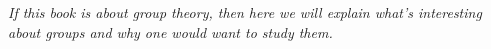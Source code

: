 
{\em If this book is about group theory, then here we will explain what's interesting about groups and why one would want to study them.}
